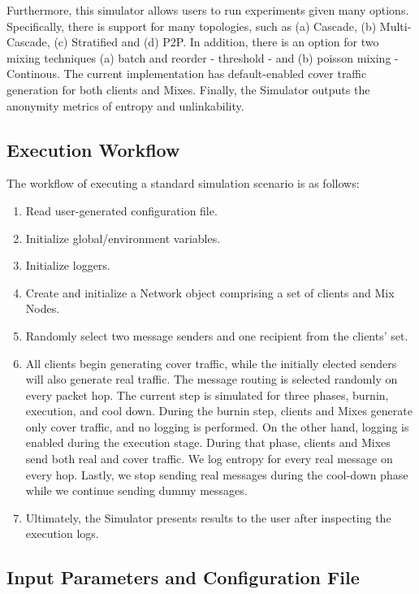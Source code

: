 \documentclass[logo,msc,cyber]{infthesis}   %
\begin{document}
Furthermore, this simulator allows users to run experiments given many options.
Specifically, there is support for many topologies, such as (a) Cascade, (b)
Multi-Cascade, (c) Stratified and (d) P2P. In addition, there is an option for two
mixing techniques (a) batch and reorder - threshold - and (b) poisson mixing
- Continous. The current implementation has default-enabled cover traffic
generation for both clients and Mixes. Finally, the Simulator outputs the
anonymity metrics of entropy and unlinkability.

\subsection{Execution Workflow}

The workflow of executing a standard simulation scenario is as follows:

\begin{enumerate}
    \item Read user-generated configuration file.
    \item Initialize global/environment variables.
    \item Initialize loggers.
    \item Create and initialize a Network object comprising a set of clients and Mix Nodes.
    \item Randomly select two message senders and one recipient from the clients' set.
    \item All clients begin generating cover traffic, while the initially
    elected senders will also generate real traffic. The message routing is
    selected randomly on every packet hop. The current step is simulated for
    three phases, burnin, execution, and cool down. During the burnin step,
    clients and Mixes generate only cover traffic, and no logging is performed.
    On the other hand, logging is enabled during the execution stage. During
    that phase, clients and Mixes send both real and cover traffic. We log
    entropy for every real message on every hop. Lastly, we stop sending real
    messages during the cool-down phase while we continue sending dummy
    messages.
    \item Ultimately, the Simulator presents results to the user after
    inspecting the execution logs.
\end{enumerate}

\subsection{Input Parameters and Configuration File}
\end{document}
